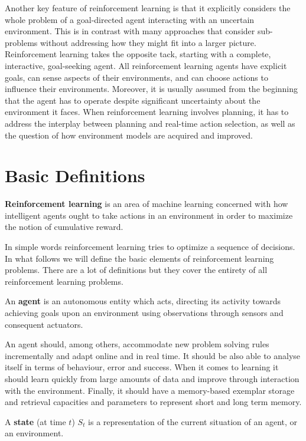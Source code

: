 Another key feature of reinforcement learning is that it explicitly considers the whole problem of a goal-directed 
agent interacting with an uncertain environment. This is in contrast with many approaches that consider sub-problems 
without addressing how they might fit into a larger picture. Reinforcement learning takes the opposite tack, starting
with a complete, interactive, goal-seeking agent. All reinforcement learning agents have explicit goals, can sense
aspects of their environments, and can choose actions to influence their environments. Moreover, it is usually 
assumed from the beginning that the agent has to operate despite significant uncertainty about the environment it 
faces. When reinforcement learning involves planning, it has to address the interplay between planning and real-time 
action selection, as well as the question of how environment models are acquired and improved.

\section{Basic Definitions}

\textbf{Reinforcement learning} is an area of machine learning concerned with how intelligent agents ought to take 
actions in an environment in order to maximize the notion of cumulative reward. 
\ed

In simple words reinforcement learning tries to optimize a sequence of decisions. In what follows we will define the 
basic elements of reinforcement learning problems. There are a lot of definitions but they cover the entirety of all 
reinforcement learning problems.

\bd[Agent]
An \textbf{agent} is an autonomous entity which acts, directing its activity towards achieving goals upon an 
environment using observations through sensors and consequent actuators. 
\ed

An agent should, among others, accommodate new problem solving rules incrementally and adapt online and in real 
time. It should be also able to analyse itself in terms of behaviour, error and success. When it comes to learning 
it should learn quickly from large amounts of data and improve through interaction with the environment. Finally, it
should have a memory-based exemplar storage and retrieval capacities and parameters to represent short and long term 
memory.

\bd[State]
A \textbf{state} (at time $t$) $S_t$ is a representation of the current situation of an agent, or an environment.
\ed

